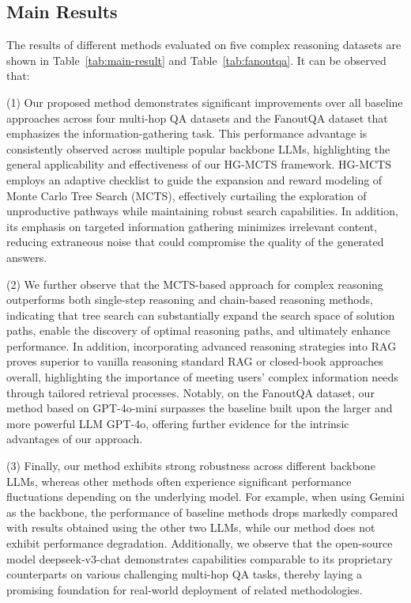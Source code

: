 \subsection{Main Results}
The results of different methods evaluated on five complex reasoning datasets are shown in Table~\ref{tab:main-result} and Table~\ref{tab:fanoutqa}. It can be observed that:

(1) Our proposed method demonstrates significant improvements over all baseline approaches across four multi-hop QA datasets and the FanoutQA dataset that emphasizes the information-gathering task. This performance advantage is consistently observed across multiple popular backbone LLMs, highlighting the general applicability and effectiveness of our HG-MCTS framework. HG-MCTS employs an adaptive checklist to guide the expansion and reward modeling of Monte Carlo Tree Search (MCTS), effectively curtailing the exploration of unproductive pathways while maintaining robust search capabilities. In addition, its emphasis on targeted information gathering minimizes irrelevant content, reducing extraneous noise that could compromise the quality of the generated answers.

(2) We further observe that the MCTS-based approach for complex reasoning outperforms both single-step reasoning and chain-based reasoning methods, indicating that tree search can substantially expand the search space of solution paths, enable the discovery of optimal reasoning paths, and ultimately enhance performance. In addition, incorporating advanced reasoning strategies into RAG proves superior to vanilla reasoning standard RAG or closed-book approaches overall, highlighting the importance of meeting users’ complex information needs through tailored retrieval processes. Notably, on the FanoutQA dataset, our method based on GPT-4o-mini surpasses the baseline built upon the larger and more powerful LLM GPT-4o, offering further evidence for the intrinsic advantages of our approach.

(3) Finally, our method exhibits strong robustness across different backbone LLMs, whereas other methods often experience significant performance fluctuations depending on the underlying model. For example, when using Gemini as the backbone, the performance of baseline methods drops markedly compared with results obtained using the other two LLMs, while our method does not exhibit performance degradation. Additionally, we observe that the open-source model deepseek-v3-chat demonstrates capabilities comparable to its proprietary counterparts on various challenging multi-hop QA tasks, thereby laying a promising foundation for real-world deployment of related methodologies.


